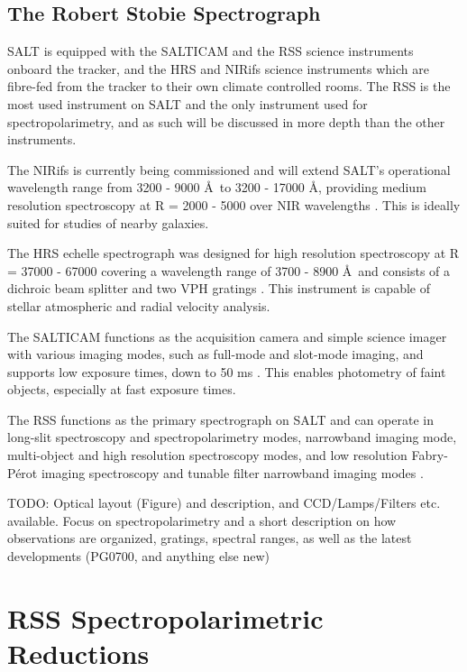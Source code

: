 \subsection{The Robert Stobie Spectrograph}

SALT is equipped with the \gls{SALTICAM} and the \gls{RSS} science instruments onboard the tracker, and the \gls{HRS} and \gls{NIRifs} science instruments which are fibre-fed from the tracker to their own climate controlled rooms. The \gls{RSS} is the most used instrument on \gls{SALT} and the only instrument used for spectropolarimetry, and as such will be discussed in more depth than the other instruments.

The \gls{NIRifs} is currently being commissioned and will extend SALT's operational wavelength range from 3200 - 9000 \AA\ to 3200 - 17000 \AA, providing medium resolution spectroscopy at R = 2000 - 5000 over NIR wavelengths \citep{NIR, SALT_NIR}. This is ideally suited for studies of nearby galaxies.

The \gls{HRS} echelle spectrograph was designed for high resolution spectroscopy at R = 37000 - 67000 covering a wavelength range of 3700 - 8900 \AA\ and consists of a dichroic beam splitter and two \gls{VPH} gratings \citep{SALT_hires}. This instrument is capable of stellar atmospheric and radial velocity analysis.

The SALTICAM functions as the acquisition camera and simple science imager with various imaging modes, such as full-mode and slot-mode imaging, and supports low exposure times, down to 50 ms \citep{SALTICAM}. This enables photometry of faint objects, especially at fast exposure times.
\prgph

The \gls{RSS} functions as the primary spectrograph on \gls{SALT} and can operate in long-slit spectroscopy and spectropolarimetry modes, narrowband imaging mode, multi-object and high resolution spectroscopy modes, and low resolution Fabry-P\'erot imaging spectroscopy and tunable filter narrowband imaging modes \citep[for an in-depth discussion on operational modes see][]{SALT_operational_modes}.
\prgph

TODO: Optical layout (Figure) and description, and CCD/Lamps/Filters etc. available. Focus on spectropolarimetry and a short description on how observations are organized, gratings, spectral ranges, as well as the latest developments (PG0700, and anything else new)
\prgph

\section{RSS Spectropolarimetric Reductions} %

